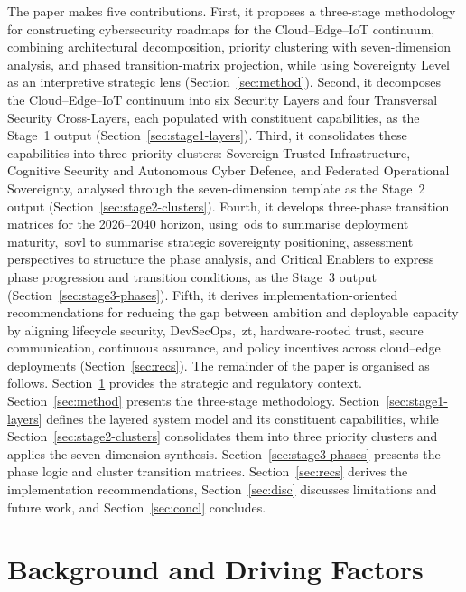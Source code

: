 \documentclass{ieeeaccess}
\begin{document}
The paper makes five contributions. First, it proposes a three-stage methodology for constructing cybersecurity roadmaps for the Cloud--Edge--IoT continuum, combining architectural decomposition, priority clustering with seven-dimension analysis, and phased transition-matrix projection, while using Sovereignty Level as an interpretive strategic lens (Section~\ref{sec:method}). Second, it decomposes the Cloud--Edge--IoT continuum into six Security Layers and four Transversal Security Cross-Layers, each populated with constituent capabilities, as the Stage~1 output (Section~\ref{sec:stage1-layers}). Third, it consolidates these capabilities into three priority clusters: Sovereign Trusted Infrastructure, Cognitive Security and Autonomous Cyber Defence, and Federated Operational Sovereignty, analysed through the seven-dimension template as the Stage~2 output (Section~\ref{sec:stage2-clusters}). Fourth, it develops three-phase transition matrices for the 2026--2040 horizon, using~\gls{ods} to summarise deployment maturity,~\gls{sovl} to summarise strategic sovereignty positioning, assessment perspectives to structure the phase analysis, and Critical Enablers to express phase progression and transition conditions, as the Stage~3 output (Section~\ref{sec:stage3-phases}). Fifth, it derives implementation-oriented recommendations for reducing the gap between ambition and deployable capacity by aligning lifecycle security, DevSecOps,~\gls{zt}, hardware-rooted trust, secure communication, continuous assurance, and policy incentives across cloud--edge deployments (Section~\ref{sec:recs}).
The remainder of the paper is organised as follows. Section~\ref{sec:background} provides the strategic and regulatory context. Section~\ref{sec:method} presents the three-stage methodology. Section~\ref{sec:stage1-layers} defines the layered system model and its constituent capabilities, while Section~\ref{sec:stage2-clusters} consolidates them into three priority clusters and applies the seven-dimension synthesis. Section~\ref{sec:stage3-phases} presents the phase logic and cluster transition matrices. Section~\ref{sec:recs} derives the implementation recommendations, Section~\ref{sec:disc} discusses limitations and future work, and Section~\ref{sec:concl} concludes.

\section{Background and Driving Factors}
\label{sec:background}
\end{document}
